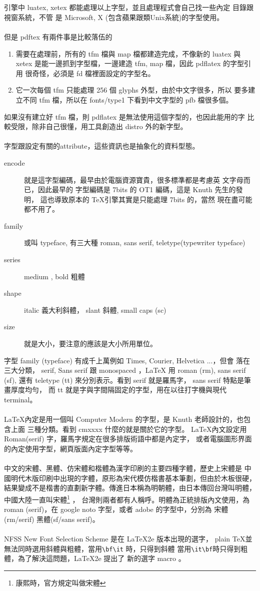\\\\
引擎中 luatex, xetex 都能處理以上字型，並且處理程式會自己找一些內定
目錄跟視窗系統，不管 是 Microsoft, X (包含蘋果跟類Unix系統)的字型使用。
\\\\
但是 pdftex 有兩件事是比較落伍的
\begin{enumerate}
\item 需要在處理前，所有的 tfm 檔與 map 檔都建造完成，不像新的 luatex
與 xetex 是能一邊抓到字型檔，一邊建造 tfm, map 檔，因此 pdflatex 的字型引用
很奇怪，必須是 fd 檔裡面設定的字型名。
\item 它一次每個 tfm 只能處理 256 個 glyphs 外型，由於中文字很多，所以
要多建立不同 tfm 檔，所以在 fonts/type1 下看到中文字型的 pfb 檔很多個。
\end{enumerate}
如果沒有建立好 tfm 檔，則 pdflatex 是無法使用這個字型的，也因此能用的字
比較受限，除非自己很懂，用工具創造出 distro 外的新字型。
\\\\
字型跟設定有關的attribute，這些資訊也是抽象化的資料型態。
\begin{description}
\item [encode] 就是這字型編碼，最早由於電腦資源寶貴，很多標準都是考慮英
文字母而已，因此最早的 \MF{} 字型編碼是 7bits 的 OT1 編碼，這是 Knuth
 先生的發明， 這也導致原本的 \TeX 引擎其實是只能處理 7bits 的，當然
現在盡可能都不用了。
\item [family] 或叫 typeface, 有三大種 roman, sans serif, teletype(typewriter typeface)
\item [series] medium , bold 粗體
\item [shape] italic 義大利斜體， slant 斜體, small caps (sc)
\item [size] 就是大小，要注意的應該是大小所用單位。
\end{description}
字型 family (typeface) 有成千上萬例如 Times, Courier, Helvetica ...，但會
落在三大分類， serif, Sans serif 跟 monospaced ，{\LaTeX} 用 roman (rm),
sans serif (sf), 還有 teletype (tt) 來分別表示。看到 serif 就是羅馬字，
sans serif 特點是筆畫厚度均勻，
而 tt 就是字與字間隔固定的字型，用在以往打字機與現代 terminal。
\\\\
\LaTeX 內定是用一個叫 Computer Modern 的字型，是 Knuth 老師設計的，也包含上面
三種分類。看到 cmxxxx 什麼的就是關於它的字型。
\LaTeX 內文設定用 Roman(serif) 字，羅馬字規定在很多排版術語中都是內定字，
或者電腦圖形界面的內定使用字型，網頁版面內定字型等等。
\\\\
中文的宋體、黑體、仿宋體和楷體為漢字印刷的主要四種字體，歷史上宋體是
中國明代木版印刷中出現的字體，原形為宋代模仿楷書基本筆劃，但由於木板很硬，
結果變成不是楷書的直劃新字體。傳進日本稱為明朝體，由日本傳回台灣叫明體，
中國大陸一直叫宋體\footnote{康熙時，官方規定叫做宋體} ，
台灣則兩者都有人稱呼。明體為正統排版內文使用，為
roman (serif)，在 google noto 字型，或者 adobe 的字型中，分別為
宋體(rm/serif) 黑體(sf/sans serif)。
\\\\
NFSS New Font Selection Scheme 是在 \LaTeX 2e 版本出現的選字，
plain \TeX 並無法同時選用斜體與粗體，當用\verb=\bf\it= 時，只得到斜體
當用\verb=\it\bf=時只得到粗體，為了解決這問題，\LaTeX 2e 提出了
新的選字 macro 。
